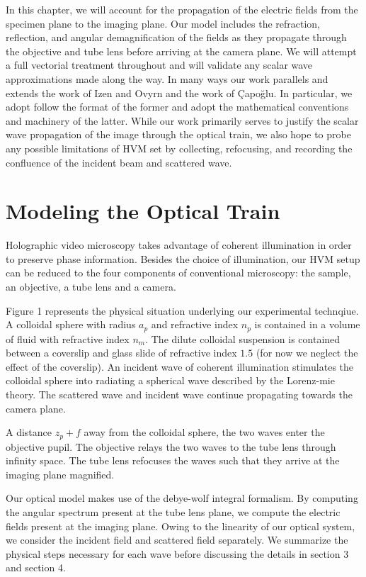 In this chapter, we will account for the propagation of the electric fields from
the specimen plane to the imaging plane. Our model includes the
refraction, reflection, and angular demagnification of the fields as they propagate
through the objective and tube lens before arriving at the camera plane.
We will attempt a full vectorial treatment throughout and will
validate any scalar wave approximations made along the way. In many ways our work
parallels and extends the work of Izen and Ovyrn\cite{izen00} and the work of
\c{C}apo\u{g}lu\cite{capoglu12}. In particular, we adopt follow the format of the
former and adopt the mathematical conventions and machinery of the latter.
While our work primarily serves to justify the scalar wave propagation of the
image through the optical train, we also hope to probe any possible limitations
of HVM set by collecting, refocusing, and recording the confluence of the incident
beam and scattered wave.


\section{Modeling the Optical Train}
Holographic video microscopy takes advantage of coherent illumination in order
to preserve phase information. Besides the choice of illumination, our HVM setup can be reduced to the four components of conventional microscopy: the sample, an objective, a tube lens and a camera.

Figure 1 represents the physical situation underlying our experimental technqiue. A colloidal sphere with radius $a_p$ and refractive index $n_p$ is contained in a volume of fluid with refractive index $n_m$. The dilute colloidal suspension is contained between a coverslip and glass slide of refractive index $1.5$ (for now we neglect the effect of the coverslip). An incident wave of coherent illumination stimulates the colloidal sphere into radiating a spherical wave described by the Lorenz-mie theory. The scattered wave and incident wave continue propagating towards the camera plane.

A distance $z_p + f$ away from the colloidal sphere, the two waves enter the objective pupil. The objective relays the two waves to the tube lens through infinity space. The tube lens refocuses the waves such that they arrive at the imaging plane magnified.

Our optical model makes use of the debye-wolf integral formalism. By computing the angular spectrum present at the tube lens plane, we compute the electric fields present at the imaging plane. Owing to the linearity of our optical system,
we consider the incident field and scattered field separately. We summarize the physical steps necessary for each wave before discussing the details in section 3 and section 4.

